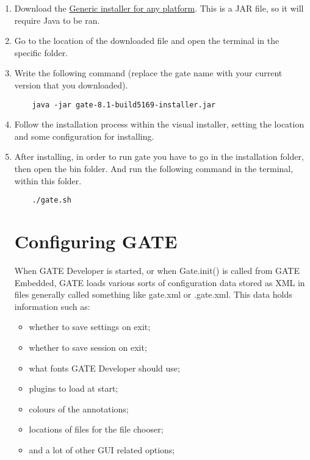 \documentclass[a4paper,12pt]{report}
\begin{document}
\begin{enumerate}
\item Download the \href{http://sourceforge.net/projects/gate/files/gate/8.1/gate-8.1-build5169-installer.jar/download}{Generic installer for any platform}. This is a JAR file, so it will require Java to be ran.
\item Go to the location of the downloaded file and open the terminal in the specific folder. 
\item Write the following command (replace the gate name with your current version that you downloaded).
      \begin{verbatim} 
	java -jar gate-8.1-build5169-installer.jar  
      \end{verbatim}
\item Follow the installation process within the visual installer, setting the location and some configuration for installing.
\item After installing, in order to run gate you have to go in the installation folder, then open the bin folder. And run the following command in the terminal, within this folder.

\begin{verbatim}
    ./gate.sh
\end{verbatim}


\section{Configuring GATE}
When GATE Developer is started, or when Gate.init() is called from GATE Embedded,
GATE loads various sorts of configuration data stored as XML in files generally called
something like gate.xml or .gate.xml. This data holds information such as:

\begin{itemize}
 \item whether to save settings on exit; 
 \item whether to save session on exit;
 \item what fonts GATE Developer should use;
 \item plugins to load at start;
 \item colours of the annotations;
 \item locations of files for the file chooser;
 \item and a lot of other GUI related options;
 \\
 \\
 \\
 

\end{itemize}
\end{enumerate}
\end{document}
